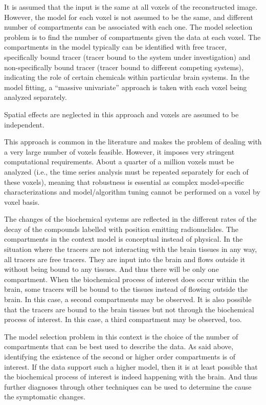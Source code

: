It is assumed that the input is the same at all voxels of the reconstructed image. However, the model for each voxel is not assumed to be the same, and different number of compartments can be associated with each one. The model selection problem is to find the number of compartments given the data at each voxel. The compartments in the model typically can be identified with free tracer, specifically bound tracer (tracer bound to the system under investigation) and non-specifically bound tracer (tracer bound to different competing systems), indicating the role of certain chemicals within particular brain systems. In the model fitting, a ``massive univariate'' approach is taken with each voxel being analyzed separately.
\begin{draftpar}
Spatial effects are neglected in this approach and voxels are assumed to be independent.
\end{draftpar}%
This approach is common in the literature and makes the problem of dealing with a very large number of voxels feasible. However, it imposes very stringent computational requirements. About a quarter of a million voxels must be analyzed (i.e., the time series analysis must be repeated separately for each of these voxels), meaning that robustness is essential as complex model-specific characterizations and model/algorithm tuning cannot be performed on a voxel by voxel basis.

\begin{draftpar}
The changes of the biochemical systems are reflected in the different rates of the decay of the compounds labelled with position emitting radionuclides. The compartments in the context \pet model is conceptual instead of physical. In the situation where the tracers are not interacting with the brain tissues in any way, all tracers are free tracers. They are input into the brain and flows outside it without being bound to any tissues. And thus there will be only one compartment. When the biochemical process of interest does occur within the brain, some tracers will be bound to the tissues instead of flowing outside the brain. In this case, a second compartments may be observed. It is also possible that the tracers are bound to the brain tissues but not through the biochemical process of interest. In this case, a third compartment may be observed, too.

The model selection problem in this context is the choice of the number of compartments that can be best used to describe the data. As said above, identifying the existence of the second or higher order compartments is of interest. If the data support such a higher model, then it is at least possible that the biochemical process of interest is indeed happening with the brain. And thus further diagnoses through other techniques can be used to determine the cause the symptomatic changes.
\end{draftpar}

